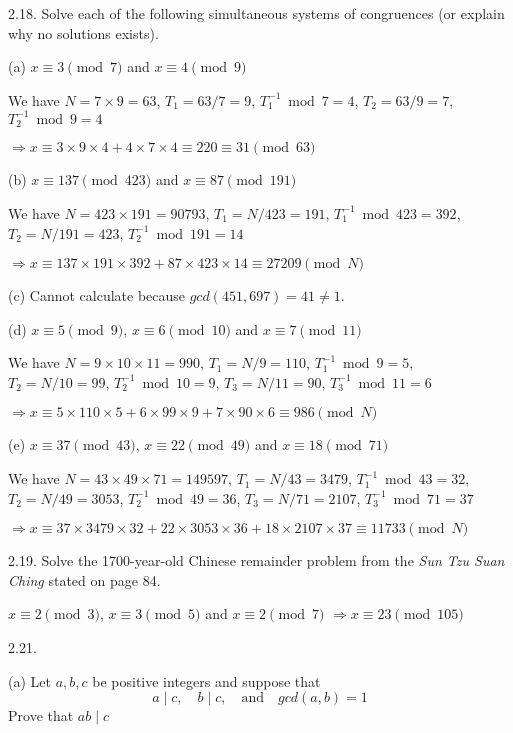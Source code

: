 2.18. Solve each of the following simultaneous systems of congruences (or explain why no solutions exists).

(a) $x \equiv 3 \pmod 7$ and $x \equiv 4 \pmod 9$
    
We have $N=7 \times 9=63$, $T_1=63/7=9$, $T_1^{-1} \bmod 7 = 4$, $T_2=63/9=7$, $T_2^{-1} \bmod 9 = 4$

$\Rightarrow x \equiv 3 \times 9 \times 4 + 4 \times 7 \times 4 \equiv 220 \equiv 31 \pmod {63}$
    
(b) $x \equiv 137 \pmod {423}$ and $x \equiv 87 \pmod {191}$
    
We have $N=423 \times 191=90793$, $T_1=N/423=191$, $T_1^{-1} \bmod 423 = 392$, $T_2=N/191=423$, $T_2^{-1} \bmod 191 = 14$

$\Rightarrow x \equiv 137 \times 191 \times 392 + 87 \times 423 \times 14 \equiv 27209 \pmod N$
    
(c) Cannot calculate because $gcd(451, 697)=41 \neq 1$.
    
(d) $x \equiv 5 \pmod 9$, $x \equiv 6 \pmod {10}$ and $x \equiv 7 \pmod {11}$
    
We have $N=9 \times 10 \times 11 = 990$, $T_1=N/9=110$, $T_1^{-1} \bmod 9 = 5$, $T_2=N/10=99$, $T_2^{-1} \bmod 10=9$, $T_3=N/11=90$, $T_3^{-1} \bmod 11 = 6$

$\Rightarrow x \equiv 5 \times 110 \times 5 + 6 \times 99 \times 9 + 7 \times 90 \times 6 \equiv 986 \pmod N$
    
(e) $x \equiv 37 \pmod {43}$, $x \equiv 22 \pmod {49}$ and $x \equiv 18 \pmod {71}$
    
We have $N=43 \times 49 \times 71=149597$, $T_1=N/43=3479$, $T_1^{-1} \bmod 43 = 32$, $T_2=N/49=3053$, $T_2^{-1} \bmod 49=36$, $T_3=N/71=2107$, $T_3^{-1} \bmod 71 = 37$

$\Rightarrow x \equiv 37 \times 3479 \times 32 + 22 \times 3053 \times 36 + 18  \times 2107 \times 37 \equiv 11733 \pmod N$

2.19. Solve the 1700-year-old Chinese remainder problem from the \textit{Sun Tzu Suan Ching} stated on page 84.

$x \equiv 2 \pmod 3$, $x \equiv 3 \pmod 5$ and $x \equiv 2 \pmod 7$ $\Rightarrow x \equiv 23 \pmod {105}$

2.21.

(a) Let $a,b,c$ be positive integers and suppose that
\begin{equation*}
    a \mid c, \quad b \mid c, \quad \text{and} \quad gcd(a,b)=1
\end{equation*}
Prove that $ab \mid c$
    
